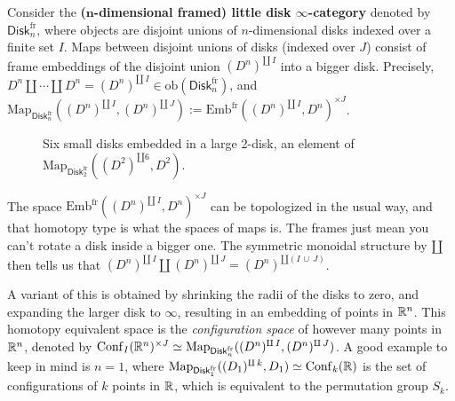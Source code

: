    \begin{example}
       Consider the \textbf{($\mathbf n$-dimensional framed) little disk $\infty$-category} denoted by $\mathsf{Disk} _n ^{\mathrm{fr}}$, where objects are disjoint unions of $n$-dimensional disks indexed over a finite set $I$. Maps between disjoint unions of disks (indexed over $J$) consist of frame embeddings of the disjoint union $(D^n )^{\amalg \,I}$ into a bigger disk. Precisely, $D ^n \amalg \cdots \amalg D^n  = (D^n )^{\amalg \,I}\in \mathrm{ob}(\mathsf{Disk} _n ^{\mathrm{fr}})$, and $\mathrm{Map}_{\mathsf{Disk} _n ^{\mathrm{fr}}}((D^n )^{\amalg \, I},(D^n )^{\amalg \,J}):= \mathrm{Emb}^{\mathrm{fr}}((D^n )^{\amalg\, I},D^n )^{\times  J}$. 
       \begin{figure}[H]
       \centering
       \caption{Six small disks embedded in a large 2-disk, an element of $\mathrm{Map}_{\mathsf{Disk} _2 ^{\mathrm{fr}}}((D^2)^{\amalg 6},D^2)$.}
       \label{disk}
       \end{figure}
       The space $\mathrm{Emb}^{\mathrm{fr}}((D^n )^{\amalg\, I},D^n )^{\times  J}$ can be topologized in the usual way, and that homotopy type is what the spaces of maps is. The frames just mean you can't rotate a disk inside a bigger one. The symmetric monoidal structure by $\amalg$ then tells us that $(D^n )^{\amalg\, I}\amalg (D^n )^{\amalg \, J}= (D^n )^{\amalg(I \,\cup \,J)}$.

       A variant of this is obtained by shrinking the radii of the disks to zero, and expanding the larger disk to $\infty$, resulting in an embedding of points in $\mathbb{R}^n $. This homotopy equivalent space is the \emph{configuration space} of however many points in $\mathbb{R}^n $, denoted by $\mathrm{Conf}_I(\mathbb{R}^n ) ^{\times  J}\simeq  \mathrm{Map}_{\mathsf{Disk} _n ^{\mathrm{fr}}}((D^n )^{\amalg \, I},(D^n )^{\amalg \, J})$. A good example to keep in mind is $n=1$, where $\mathrm{Map}_{\mathsf{Disk} _1^{\mathrm{fr}}}((D_1)^{\amalg \, k},D_1) \simeq \mathrm{Conf}_k(\mathbb{R} )$ is the set of  configurations of $k$ points in $\mathbb{R}$, which is equivalent to the permutation group $S_k$.
   \end{example}

